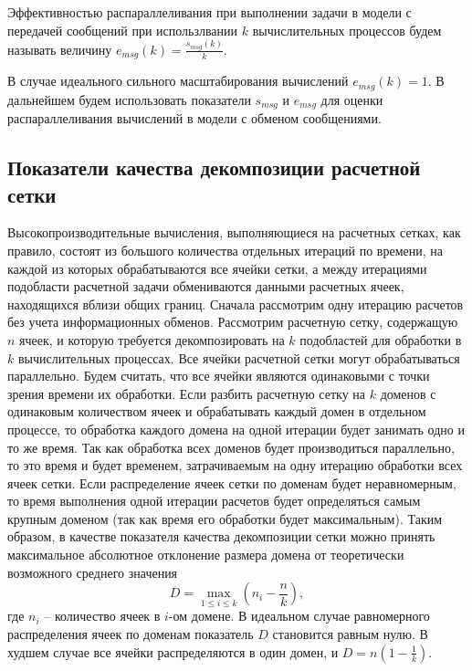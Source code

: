 \begin{definition}
Эффективностью распараллеливания при выполнении задачи в модели с передачей сообщений\label{term:msg_eff} при использлвании $k$ вычислительных процессов будем называть величину $e_{msg}(k) = \frac{s_{msg}(k)}{k}$.
\end{definition}

В случае идеального сильного масштабирования вычислений $e_{msg}(k) = 1$.
В дальнейшем будем использовать показатели $s_{msg}$ и $e_{msg}$ для оценки распараллеливания вычислений в модели с обменом сообщениями.


\subsection{Показатели качества декомпозиции расчетной сетки}

Высокопроизводительные вычисления, выполняющиеся на расчетных сетках, как правило, состоят из большого количества отдельных итераций по времени, на каждой из которых обрабатываются все ячейки сетки, а между итерациями подобласти расчетной задачи обмениваются данными расчетных ячеек, находящихся вблизи общих границ.
Сначала рассмотрим одну итерацию расчетов без учета информационных обменов.
Рассмотрим расчетную сетку, содержащую $n$ ячеек, и которую требуется декомпозировать на $k$ подобластей для обработки в $k$ вычислительных процессах.
Все ячейки расчетной сетки могут обрабатываться параллельно.
Будем считать, что все ячейки являются одинаковыми с точки зрения времени их обработки.
Если разбить расчетную сетку на $k$ доменов с одинаковым количеством ячеек и обрабатывать каждый домен в отдельном процессе, то обработка каждого домена на одной итерации будет занимать одно и то же время.
Так как обработка всех доменов будет производиться параллельно, то это время и будет временем, затрачиваемым на одну итерацию обработки всех ячеек сетки.
Если распределение ячеек сетки по доменам будет неравномерным, то время выполнения одной итерации расчетов будет определяться самым крупным доменом (так как время его обработки будет максимальным).
Таким образом, в качестве показателя качества декомпозиции сетки можно принять максимальное абсолютное отклонение размера домена от теоретически возможного среднего значения
\begin{equation}
	D = \max_{1 \le i \le k}{ \left( n_i - \frac{n}{k} \right) },
\end{equation}
где $n_i$ – количество ячеек в $i$-ом домене.
В идеальном случае равномерного распределения ячеек по доменам показатель $D$ становится равным нулю.
В худшем случае все ячейки распределяются в один домен, и $D = n \left( 1 - \frac{1}{k} \right)$.

